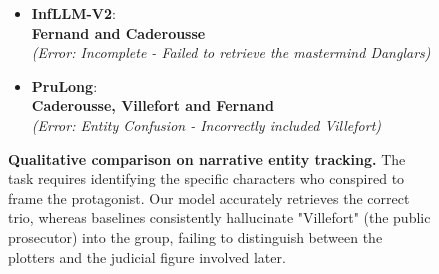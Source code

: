 \begin{figure}[ht]
\begin{AcademicBox}
\begin{itemize}[leftmargin=*, label={}, itemsep=4pt, topsep=2pt]
 \item \textbf{InfLLM-V2}: \\
 \textbf{Fernand and Caderousse} \\
    \textit{(Error: Incomplete - Failed to retrieve the mastermind Danglars)}

 \item \textbf{PruLong}: \\
 \textbf{Caderousse, Villefort and Fernand} \\
    \textit{(Error: Entity Confusion - Incorrectly included Villefort)}

\end{itemize}

\end{AcademicBox}
\caption{\textbf{Qualitative comparison on narrative entity tracking.} The task requires identifying the specific characters who conspired to frame the protagonist. Our model accurately retrieves the correct trio, whereas baselines consistently hallucinate "Villefort" (the public prosecutor) into the group, failing to distinguish between the plotters and the judicial figure involved later.}
\label{fig:case_montecristo}
\end{figure}